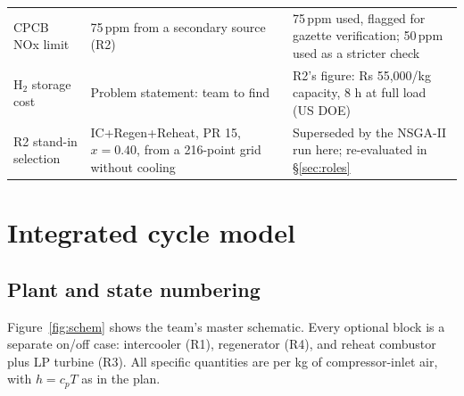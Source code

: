 \documentclass[10.5pt,a4paper]{article}
\begin{document}
\begin{table}[H]
\begin{tabular}{p{3.2cm}p{6.2cm}p{5.6cm}}
CPCB NOx limit & 75\,ppm from a secondary source (R2) & 75\,ppm used, flagged for gazette verification; 50\,ppm used as a stricter check\\
H$_2$ storage cost & Problem statement: team to find & R2's figure: Rs 55,000/kg capacity, 8 h at full load (US DOE)\\
R2 stand-in selection & IC+Regen+Reheat, PR 15, $x=0.40$, from a 216-point grid without cooling & Superseded by the NSGA-II run here; re-evaluated in \S\ref{sec:roles}\\\bottomrule
\end{tabular}\end{table}

\section{Integrated cycle model}\label{sec:model}
\subsection{Plant and state numbering}
Figure~\ref{fig:schem} shows the team's master schematic. Every optional block is a separate on/off case: intercooler (R1), regenerator (R4), and reheat combustor plus LP turbine (R3). All specific quantities are per kg of compressor-inlet air, with $h=c_pT$ as in the plan.
\end{document}
